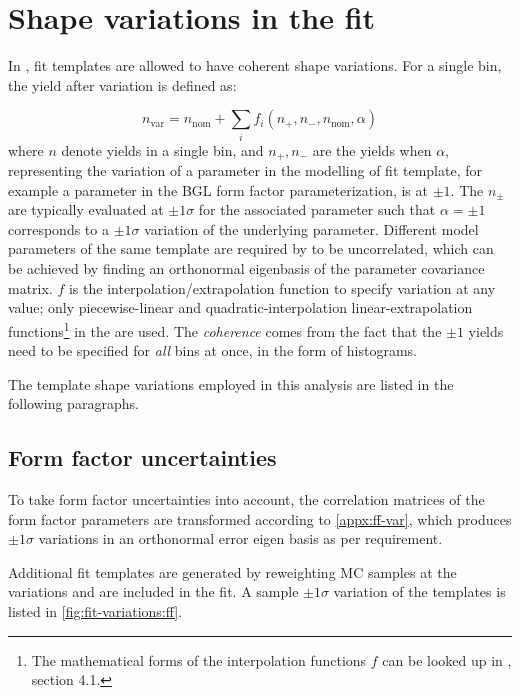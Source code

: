 \section{Shape variations in the fit}
\label{ref:fit:var}

In \HistFactory, fit templates are allowed to have coherent shape variations.
For a single bin, the yield after variation is defined as:

\begin{equation}
    n_\text{var} = n_\text{nom} + \sum_i f_i(n_+, n_-, n_\text{nom}, \alpha)
\end{equation}
where $n$ denote yields in a single bin, and
$n_+, n_-$ are the yields when $\alpha$,
representing the variation of a parameter in the modelling of fit template,
for example a parameter in the BGL form factor parameterization,
is at $\pm 1$.
The $n_\pm$ are typically evaluated at $\pm 1 \sigma$ for the associated
parameter such that $\alpha = \pm 1$ corresponds to a $\pm 1 \sigma$ variation
of the underlying parameter.
Different model parameters of the same template are required by \HistFactory to
be uncorrelated,
which can be achieved by finding an orthonormal eigenbasis of the parameter
covariance matrix.
$f$ is the interpolation/extrapolation function to specify variation
at any value;
only piecewise-linear and quadratic-interpolation linear-extrapolation
functions\footnote{
    The mathematical forms of the interpolation functions $f$ can be looked
    up in \cite{Cranmer:2012sba}, section 4.1.
} in the \HistFactory are used.
The \emph{coherence} comes from the fact that the $\pm 1$ yields need to be
specified for \emph{all} bins at once, in the form of histograms.

The template shape variations employed in this analysis are listed in the
following paragraphs.


\subsection{Form factor uncertainties}

To take form factor uncertainties into account, the correlation
matrices of the form factor parameters are transformed
according to \cref{appx:ff-var}, which produces $\pm 1\sigma$ variations
in an orthonormal error eigen basis as per \HistFactory requirement.

Additional fit templates are generated by reweighting MC samples at the
variations and are included in the fit.
A sample $\pm 1\sigma$ variation of the \Dz\mun templates is listed in
\cref{fig:fit-variations:ff}.

